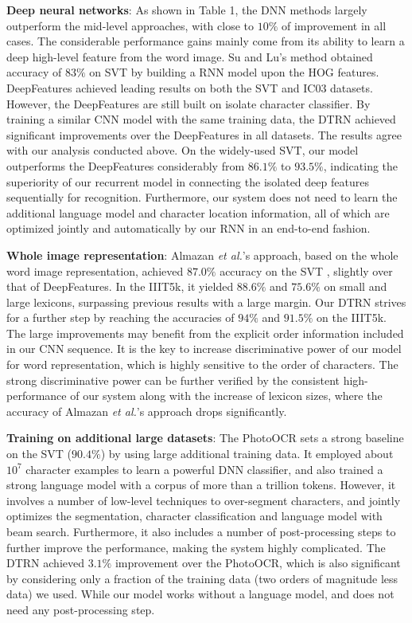 \documentclass[letterpaper]{article}
\begin{document}
\textbf{Deep neural networks}: As shown in Table 1, the DNN methods largely outperform the mid-level approaches, with close to $10\%$ of improvement in all cases. The considerable performance gains mainly come from its ability to learn a deep high-level feature from the word image. Su and Lu's method obtained accuracy of $83\%$ on SVT by building a RNN model upon the HOG features. DeepFeatures achieved leading results on both the SVT and IC03 datasets. However, the DeepFeatures are still built on isolate character classifier. By training a similar CNN model with the same training data, the DTRN achieved significant improvements over the DeepFeatures in all datasets. The results agree with our analysis conducted above. On the widely-used SVT, our model outperforms the DeepFeatures considerably from $86.1\%$ to $93.5\%$, indicating the superiority of our recurrent model in connecting the isolated deep features sequentially for recognition.  Furthermore, our system does not need to learn the additional language model and character location information, all of which are optimized jointly and automatically by our RNN in an end-to-end fashion.




\textbf{Whole image representation}:
Almazan \emph{et al.}'s approach, based on the whole word image representation, achieved $87.0\%$ accuracy on the SVT \cite{Almazan2014}, slightly over that of DeepFeatures. In the IIIT5k, it yielded $88.6\%$ and $75.6\%$ on small and large lexicons, surpassing previous results with a large margin. Our DTRN strives for a further step by reaching the accuracies of $94\%$ and $91.5\%$ on the IIIT5k. The large improvements may benefit from the explicit order information included in our CNN sequence. It is the key to increase discriminative power of our model for word representation, which is highly sensitive to the order of characters. The strong discriminative power can be further verified by the consistent high-performance of our system along with the increase of lexicon sizes, where the accuracy of Almazan \emph{et al.}'s approach drops significantly.

\textbf{Training on additional large datasets}: The PhotoOCR \cite{Bissacco2013} sets a strong baseline on the SVT ($90.4\%$) by using large additional training data.
 It employed about $10^7$ character examples to learn a powerful DNN classifier, and also trained a strong language model with a corpus of more than a trillion tokens. However, it involves a number of low-level techniques to over-segment characters, and jointly optimizes the segmentation, character classification and language model with beam search.  Furthermore, it also includes a number of post-processing steps to further improve the performance, making the system highly complicated.
 The DTRN achieved $3.1\%$ improvement over the PhotoOCR, which is also significant by considering only a fraction of the training data (two orders of magnitude less data) we used. While our model works without a language model, and does not need any post-processing step.
\end{document}
